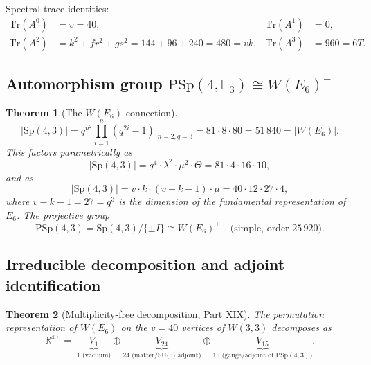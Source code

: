 \documentclass[12pt,a4paper]{article}
\newtheorem{theorem}{Theorem}[section]
\theoremstyle{definition}
\newcommand{\Sp}{\mathrm{Sp}}
\newcommand{\PSp}{\mathrm{PSp}}
\renewcommand{\Tr}{\mathrm{Tr}}
\newcommand{\FF}{\mathbb{F}}
\newcommand{\RR}{\mathbb{R}}
\begin{document}
Spectral trace identities:
\begin{align}
  \Tr(A^0) &= v = 40, &
  \Tr(A^1) &= 0, \\
  \Tr(A^2) &= k^2+fr^2+gs^2 = 144+96+240 = 480 = vk, &
  \Tr(A^3) &= 960 = 6T.
\end{align}

\subsection{Automorphism group \texorpdfstring{$\PSp(4,\FF_3)\cong W(E_6)^+$}{PSp(4,F3)}}

\begin{theorem}[The $W(E_6)$ connection]
\label{thm:e6}
\begin{equation}
  |\Sp(4,3)| = q^{n^2}\prod_{i=1}^n(q^{2i}-1)\big|_{n=2,q=3}
             = 81\cdot 8\cdot 80 = 51\,840 = |W(E_6)|.
\end{equation}
This factors parametrically as
\begin{equation}
  |\Sp(4,3)| = q^4\cdot\lambda^2\cdot\mu^2\cdot\Theta = 81\cdot 4\cdot 16\cdot 10,
\end{equation}
and as
\begin{equation}
  |\Sp(4,3)| = v\cdot k\cdot(v-k-1)\cdot\mu = 40\cdot 12\cdot 27\cdot 4,
\end{equation}
where $v-k-1=27=q^3$ is the dimension of the fundamental representation
of $E_6$.  The projective group
\begin{equation}
  \PSp(4,3) = \Sp(4,3)/\{\pm I\} \cong W(E_6)^+
  \quad\text{(simple, order $25\,920$)}.
\end{equation}
\end{theorem}

\subsection{Irreducible decomposition and adjoint identification}
\label{ssec:irred}

\begin{theorem}[Multiplicity-free decomposition, Part XIX]
\label{thm:mfd}
The permutation representation of $W(E_6)$ on the $v=40$ vertices of
$W(3,3)$ decomposes as
\begin{equation}
  \RR^{40} \;=\;
  \underbrace{V_1}_{1\text{ (vacuum)}}
  \oplus
  \underbrace{V_{24}}_{24\text{ (matter/SU(5) adjoint)}}
  \oplus
  \underbrace{V_{15}}_{15\text{ (gauge/adjoint of }\PSp(4,3))}.
\end{equation}
\end{theorem}
\end{document}
